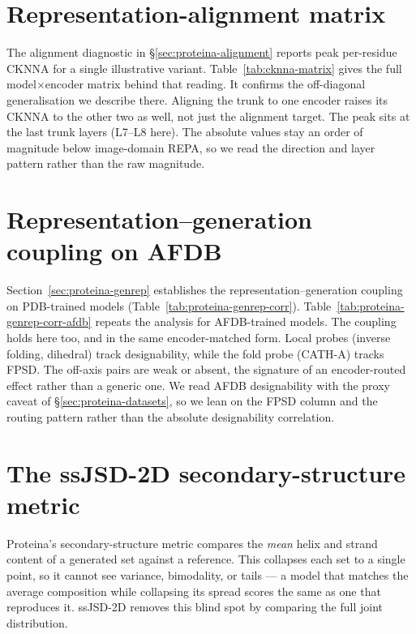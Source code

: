 \documentclass[12pt,a4paper,twoside]{report}
\begin{document}


\section{Representation-alignment matrix}
\label{app:cknna}

The alignment diagnostic in \S\ref{sec:proteina-alignment} reports peak per-residue CKNNA for a single illustrative variant. Table~\ref{tab:cknna-matrix} gives the full model$\times$encoder matrix behind that reading. It confirms the off-diagonal generalisation we describe there. Aligning the trunk to one encoder raises its CKNNA to the other two as well, not just the alignment target. The peak sits at the last trunk layers (L7--L8 here). The absolute values stay an order of magnitude below image-domain REPA, so we read the direction and layer pattern rather than the raw magnitude.



\section{Representation--generation coupling on AFDB}
\label{app:genrep-afdb}

Section~\ref{sec:proteina-genrep} establishes the representation--generation coupling on PDB-trained models (Table~\ref{tab:proteina-genrep-corr}). Table~\ref{tab:proteina-genrep-corr-afdb} repeats the analysis for AFDB-trained models. The coupling holds here too, and in the same encoder-matched form. Local probes (inverse folding, dihedral) track designability, while the fold probe (CATH-A) tracks FPSD. The off-axis pairs are weak or absent, the signature of an encoder-routed effect rather than a generic one. We read AFDB designability with the proxy caveat of \S\ref{sec:proteina-datasets}, so we lean on the FPSD column and the routing pattern rather than the absolute designability correlation.



\section{The ssJSD-2D secondary-structure metric}
\label{app:ssjsd}

Proteina's secondary-structure metric compares the \emph{mean} helix and strand content of a generated set against a reference. This collapses each set to a single point, so it cannot see variance, bimodality, or tails --- a model that matches the average composition while collapsing its spread scores the same as one that reproduces it. ssJSD-2D removes this blind spot by comparing the full joint distribution.
\end{document}
